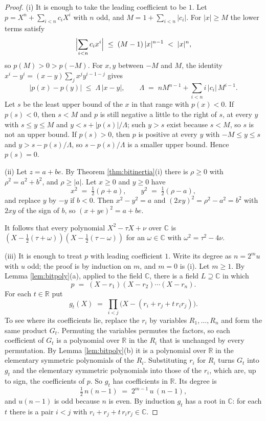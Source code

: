 \documentclass[11pt]{article}
\theoremstyle{plain}
\theoremstyle{definition}
\theoremstyle{plain}
\theoremstyle{definition}
\newcommand{\R}{\mathbb{R}}
\newcommand{\C}{\mathbb{C}}
\begin{document}
\begin{proof}
(i) It is enough to take the leading coefficient to be $1$. Let $p = X^{n} + \sum_{i<n} c_{i}X^{i}$ with $n$ odd, and $M = 1 + \sum_{i<n}|c_{i}|$. For $|x| \geq M$ the lower terms satisfy
\[
\Bigl|\sum_{i<n} c_{i}x^{i}\Bigr| \;\leq\; (M - 1)\,|x|^{n-1} \;<\; |x|^{n},
\]
so $p(M) > 0 > p(-M)$. For $x, y$ between $-M$ and $M$, the identity $x^{i} - y^{i} = (x - y)\sum_{j} x^{j}y^{i-1-j}$ gives
\[
|p(x) - p(y)| \;\leq\; \Lambda\,|x - y|, \qquad \Lambda \;=\; nM^{n-1} + \sum_{i<n} i\,|c_{i}|\,M^{i-1} .
\]
Let $s$ be the least upper bound of the $x$ in that range with $p(x) < 0$. If $p(s) < 0$, then $s < M$ and $p$ is still negative a little to the right of $s$, at every $y$ with $s \leq y \leq M$ and $y < s + |p(s)|/\Lambda$; such $y > s$ exist because $s < M$, so $s$ is not an upper bound. If $p(s) > 0$, then $p$ is positive at every $y$ with $-M \leq y \leq s$ and $y > s - p(s)/\Lambda$, so $s - p(s)/\Lambda$ is a smaller upper bound. Hence $p(s) = 0$.

(ii) Let $z = a + be$. By Theorem \ref{thm:bitinertia}(i) there is $\rho \geq 0$ with $\rho^{2} = a^{2} + b^{2}$, and $\rho \geq |a|$. Let $x \geq 0$ and $y \geq 0$ have
\[
x^{2} \;=\; \tfrac12(\rho + a), \qquad y^{2} \;=\; \tfrac12(\rho - a),
\]
and replace $y$ by $-y$ if $b < 0$. Then $x^{2} - y^{2} = a$ and $(2xy)^{2} = \rho^{2} - a^{2} = b^{2}$ with $2xy$ of the sign of $b$, so $(x + ye)^{2} = a + be$.

It follows that every polynomial $X^{2} - \tau X + \nu$ over $\C$ is $(X - \tfrac12(\tau + \omega))(X - \tfrac12(\tau - \omega))$ for an $\omega \in \C$ with $\omega^{2} = \tau^{2} - 4\nu$.

(iii) It is enough to treat $p$ with leading coefficient $1$. Write its degree as $n = 2^{m}u$ with $u$ odd; the proof is by induction on $m$, and $m = 0$ is (i). Let $m \geq 1$. By Lemma \ref{lem:bitpoly}(a), applied to the field $\C$, there is a field $L \supseteq \C$ in which
\[
p \;=\; (X - r_{1})(X - r_{2}) \cdots (X - r_{n}) .
\]
For each $t \in \R$ put
\[
g_{t}(X) \;=\; \prod_{i < j} \bigl(X - (r_{i} + r_{j} + t\,r_{i}r_{j})\bigr) .
\]
To see where its coefficients lie, replace the $r_{i}$ by variables $R_{1}, \dots, R_{n}$ and form the same product $G_{t}$. Permuting the variables permutes the factors, so each coefficient of $G_{t}$ is a polynomial over $\R$ in the $R_{i}$ that is unchanged by every permutation. By Lemma \ref{lem:bitpoly}(b) it is a polynomial over $\R$ in the elementary symmetric polynomials of the $R_{i}$. Substituting $r_{i}$ for $R_{i}$ turns $G_{t}$ into $g_{t}$ and the elementary symmetric polynomials into those of the $r_{i}$, which are, up to sign, the coefficients of $p$. So $g_{t}$ has coefficients in $\R$. Its degree is
\[
\tfrac12\,n(n-1) \;=\; 2^{m-1}\,u\,(n - 1),
\]
and $u(n-1)$ is odd because $n$ is even. By induction $g_{t}$ has a root in $\C$: for each $t$ there is a pair $i < j$ with $r_{i} + r_{j} + t\,r_{i}r_{j} \in \C$.


\end{proof}
\end{document}
